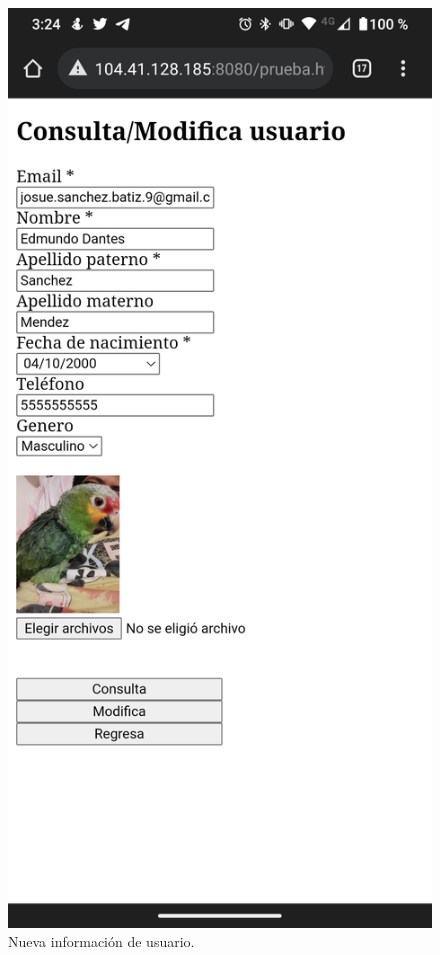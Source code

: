 \documentclass[11pt]{article}
\begin{document}
		\begin{figure}[H]
			\centering
			\includegraphics[scale=0.18]{resources/Screenshot_20211024-152450.png}
			\caption{Nueva información de usuario.}\label{fig:picture}
		\end{figure}
\end{document}
